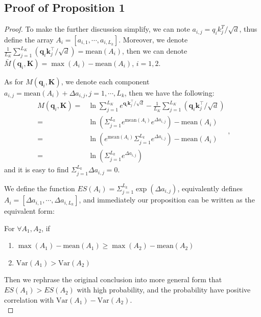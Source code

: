 \documentclass[letterpaper]{article} %
\begin{document}
\begin{appendices}
\subsection{Proof of Proposition 1}
\label{sec:appendix.proof2}
\begin{proof}
To make the further discussion simplify, we can note $a_{i,j}={q_i k_j^T}/{\sqrt{d}}$, thus define the array $A_i = [a_{i,1},\cdots,a_{i,L_k}]$. Moreover, we denote $\frac{1}{L_{K}} \sum_{j=1}^{L_{K}} ({\mathbf{q}_{i} \mathbf{k}_{j}^{\top}}/{\sqrt{d}})=\mathrm{mean}(A_i)$, then we can denote $\bar{M}\left(\mathbf{q}_{i}, \mathbf{K}\right)=\max(A_i)-\mathrm{mean}(A_i)$, $i=1,2$.

As for $M\left(\mathbf{q}_{i}, \mathbf{K}\right)$, we denote each component $a_{i,j}= \mathrm{mean}(A_i) + \Delta a_{i,j},j=1,\cdots,L_k$, then we have the following:
\begin{equation}
\nonumber
\begin{aligned}
M\left(\mathbf{q}_{i}, \mathbf{K}\right)=&\ln \sum_{j=1}^{L_{K}} e^{{\mathbf{q}_{i} \mathbf{k}_{j}^{\top}}/{\sqrt{d}}}-\frac{1}{L_{K}}
\sum_{j=1}^{L_{K}} ({\mathbf{q}_{i} \mathbf{k}_{j}^{\top}}/{\sqrt{d}})\\
=&\ln(\Sigma_{j=1}^{L_k} e^{\mathrm{mean}(A_i)}e^{\Delta a_{i,j}})-\mathrm{mean}(A_i)\\
=&\ln(e^{\mathrm{mean}(A_i)} \Sigma_{j=1}^{L_k} e^{\Delta a_{i,j}})-\mathrm{mean}(A_i)\\
=&\ln(\Sigma_{j=1}^{L_k}e^{\Delta a_{i,j}})
\end{aligned},
\end{equation}
and it is easy to find $\Sigma_{j=1}^{L_k}\Delta a_{i,j} = 0$.

We define the function $ES(A_i)=\Sigma_{j=1}^{L_k}\exp(\Delta a_{i,j})$, equivalently defines $A_i = [\Delta a_{i,1},\cdots,\Delta a_{i,L_k}]$, and immediately our proposition can be written as the equivalent form:

For $\forall A_1,A_2$, if
\begin{enumerate}[nosep,  leftmargin=0.85cm]
\item $\max(A_1)-\mathrm{mean}(A_1)\geq \max(A_2)-\mathrm{mean}(A_2)$
\item $\mathrm{Var}(A_1) > \mathrm{Var}(A_2)$
\end{enumerate}
Then we rephrase the original conclusion into more general form that $ES(A_1)>ES(A_2)$ with high probability, and the probability have positive correlation with $\mathrm{Var}(A_1)-\mathrm{Var}(A_2)$.\\


\end{proof}
\end{appendices}
\end{document}
